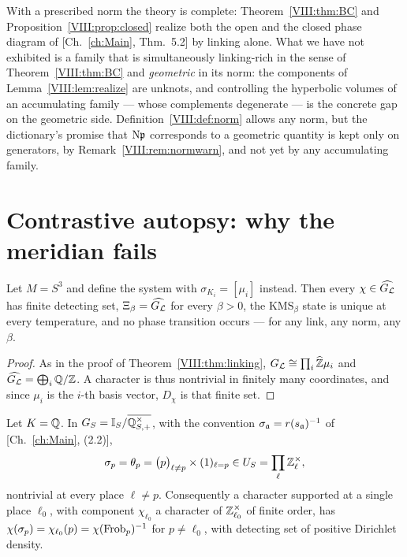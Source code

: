 \begin{remark}\label{VIII:rem:volopen}
With a prescribed norm the theory is complete: Theorem~\ref{VIII:thm:BC} and
Proposition~\ref{VIII:prop:closed} realize both the open and the closed phase diagram of
[Ch.~\ref{ch:Main}, Thm.~5.2] by linking alone. What we have not exhibited is a family that is
simultaneously linking-rich in the sense of Theorem~\ref{VIII:thm:BC} and \emph{geometric} in its
norm: the components of Lemma~\ref{VIII:lem:realize} are unknots, and controlling the hyperbolic
volumes of an accumulating family --- whose complements degenerate --- is the concrete gap on
the geometric side. Definition~\ref{VIII:def:norm} allows any norm, but the dictionary's promise
that $\mathrm{N}\mathfrak{p}$ corresponds to a geometric quantity is kept only on generators, by
Remark~\ref{VIII:rem:normwarn}, and not yet by any accumulating family.
\end{remark}

\section{Contrastive autopsy: why the meridian fails}\label{VIII:sec:autopsy}

\begin{theorem}\label{VIII:thm:meridian}
Let $M=S^3$ and define the system with $\sigma_{K_i}=[\mu_i]$ instead. Then every
$\chi\in\widehat{G_{\mathcal{L}}}$ has finite detecting set, $\Xi_\beta=\widehat{G_{\mathcal{L}}}$ for every
$\beta>0$, the $\mathrm{KMS}_\beta$ state is unique at every temperature, and no phase
transition occurs --- for any link, any norm, any $\beta$.
\end{theorem}

\begin{proof}
As in the proof of Theorem~\ref{VIII:thm:linking}, $G_{\mathcal{L}}\cong\prod_i\widehat{\mathbb{Z}}\mu_i$ and
$\widehat{G_{\mathcal{L}}}=\bigoplus_i\mathbb{Q}/\mathbb{Z}$. A character is thus nontrivial in finitely many
coordinates, and since $\mu_i$ is the $i$-th basis vector, $D_\chi$ is that finite set.
\end{proof}

\begin{proposition}\label{VIII:prop:spread}
Let $K=\mathbb{Q}$. In $G_S=\mathbb{I}_S/\overline{\mathbb{Q}^\times_{S,+}}$, with the convention
$\sigma_{\mathfrak{a}}=r(s_{\mathfrak{a}})^{-1}$ of [Ch.~\ref{ch:Main}, (2.2)],
\begin{equation}\label{VIII:eq:sigmap}
\sigma_p=\theta_p=\bigl(p\bigr)_{\ell\ne p}\times(1)_{\ell=p}\in U_S=\prod_\ell\mathbb{Z}_\ell^\times ,
\end{equation}
nontrivial at every place $\ell\ne p$. Consequently a character supported at a single place
$\ell_0$, with component $\chi_{\ell_0}$ a character of $\mathbb{Z}_{\ell_0}^\times$ of finite order,
has $\chi(\sigma_p)=\chi_{\ell_0}(p)=\chi(\operatorname{Frob}_p)^{-1}$ for $p\ne\ell_0$, with detecting set
of positive Dirichlet density.
\end{proposition}

